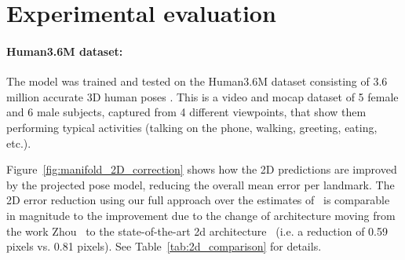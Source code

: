 \documentclass[10pt,twocolumn,letterpaper]{article}
\begin{document}
\section{Experimental evaluation}
\label{sec:exper-eval}
\paragraph{Human3.6M dataset:}
The  model was trained and tested on the Human3.6M dataset consisting
of 3.6 million accurate 3D human poses \cite{ionescu2014human3}. This
is a video and mocap dataset of 5 female and 6 male subjects, captured from 4
different viewpoints, that show them performing typical activities
(talking on the phone, walking, greeting, eating, etc.).
%

Figure~\ref{fig:manifold_2D_correction} shows how the 2D predictions
are improved by the  projected pose model, reducing the overall mean
error per landmark. The 2D error reduction  using our full approach
over the estimates of~\cite{wei2016convolutional} is comparable in
magnitude to the improvement due to the change of architecture moving
from the work Zhou~\etal\cite{zhou2015sparseness} to the
state-of-the-art 2d architecture~\cite{wei2016convolutional} (i.e. a
reduction of 0.59 pixels vs. 0.81 pixels). See
Table~\ref{tab:2d_comparison} for details.
\end{document}
